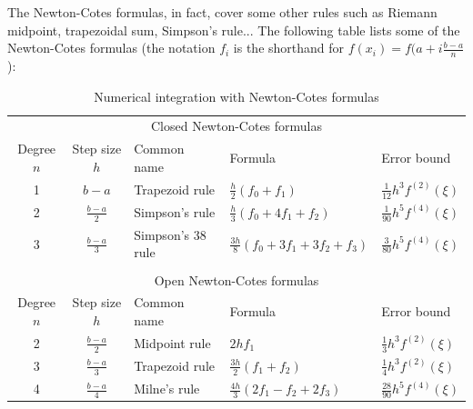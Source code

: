 The Newton-Cotes formulas, in fact, cover some other rules such as Riemann midpoint, trapezoidal sum, Simpson's rule... The following table lists some of the Newton-Cotes formulas (the notation $f_i$ is the shorthand for $f(x_i) = f(a + i \frac{b-a}{n}$):
\begin{table}[H]
\begin{center}
\caption{Numerical integration with Newton-Cotes formulas}
\begin{tabular}{cclll}
\multicolumn{5}{c}{Closed Newton-Cotes formulas}                                                                              \\
Degree $n$ & Step size $h$   & Common name       & Formula                                 & Error bound                      \\
\hline
1          & $b-a$           & Trapezoid rule    & $\frac{h}{2} (f_0 + f_1)$               & $\frac{1}{12} h^3 f^{(2)}(\xi)$  \\
2          & $\frac{b-a}{2}$ & Simpson's rule    & $\frac{h}{3} (f_0 + 4f_1 + f_2)$        & $\frac{1}{90} h^5 f^{(4)}(\xi)$  \\
3          & $\frac{b-a}{3}$ & Simpson's 38 rule & $\frac{3h}{8} (f_0 + 3f_1 + 3f_2 + f_3)$ & $\frac{3}{80} h^5 f^{(4)}(\xi)$  \\
           &                 &                   &                                         &                                  \\
\multicolumn{5}{c}{Open Newton-Cotes formulas}                                                                                \\
Degree $n$ & Step size $h$   & Common name       & Formula                                 & Error bound                      \\
\hline
2          & $\frac{b-a}{2}$ & Midpoint rule     & $2h f_1$                                & $\frac{1}{3} h^3 f^{(2)}(\xi)$   \\
3          & $\frac{b-a}{3}$ & Trapezoid rule    & $\frac{3h}{2} (f_1 + f_2)$              & $\frac{1}{4} h^3 f^{(2)}(\xi)$   \\
4          & $\frac{b-a}{4}$ & Milne's rule      & $\frac{4h}{3} (2f_1 - f_2 + 2f_3)$      & $\frac{28}{90} h^5 f^{(4)}(\xi)$
\end{tabular}
\end{center}
\end{table}



